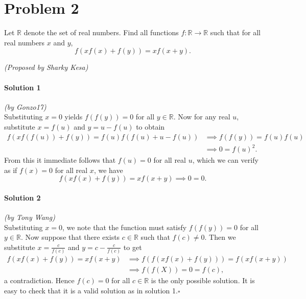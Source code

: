 \documentclass[10pt]{article}
\begin{document}
	\newpage
	
	\section*{Problem 2}
	
	Let \(\mathbb{R}\) denote the set of real numbers. Find all functions \(f:\mathbb{R} \to \mathbb{R}\) such that for all real numbers \(x\) and \(y\), \[f(x f(x) + f(y)) = x f(x + y).\]
	\begin{flushright}
	\textit{(Proposed by Sharky Kesa)}
	\end{flushright}
	
		\noindent \makebox[\linewidth]{\rule{\textwidth}{0.4pt}}
	
	\paragraph{Solution 1} \textit{(by Gonzo17)}\\
	
	\noindent Substituting \(x = 0\) yields \(f(f(y)) = 0\) for all \(y \in \mathbb{R}\). Now for any real \(u\), substitute \(x = f(u)\) and \(y = u - f(u)\) to obtain
	\begin{align*}
	f(x f(f(u)) + f(y)) = f(u) f(f(u) + u - f(u)) &\implies f(f(y)) = f(u) f(u)\\
	&\implies 0 = f(u)^2.
	\end{align*}
	 From this it immediate follows that \(f(u) = 0\) for all real \(u\), which we can verify as if \(f(x) = 0\) for all real \(x\), we have \[f(xf(x) + f(y)) = xf(x+y) \implies 0 = 0. \tag*{\(\square\)}\]
	
		\noindent \makebox[\linewidth]{\rule{\textwidth}{0.4pt}}
	
	\paragraph{Solution 2} \textit{(by Tony Wang)}\\
	
	\noindent Substituting \(x = 0\), we note that the function must satisfy \(f(f(y)) = 0\) for all \(y \in \mathbb{R}\). Now suppose that there exists \(c \in \mathbb{R}\) such that \(f(c) \neq 0\). Then we substitute \(x = \frac{c}{f(c)}\) and \(y = c-\frac{c}{f(c)}\) to get
	\begin{align*}
	f(xf(x) + f(y)) = xf(x+y) &\implies f(f(xf(x) + f(y))) = f(xf(x+y))\\ &\implies f(f(X)) = 0 = f(c),
	\end{align*}
	a contradiction. Hence \(f(c) = 0\) for all \(c \in \mathbb{R}\) is the only possible solution. It is easy to check that it is a valid solution as in solution 1.\hfill\ensuremath{\square}\\
	
\end{document}
